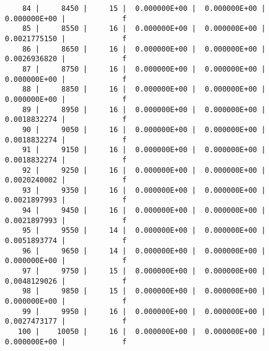 \documentclass[
  letterpaper,
  DIV=11,
  numbers=noendperiod]{scrartcl}
\begin{document}
\begin{verbatim}
    84 |     8450 |     15 |  0.000000E+00 |  0.000000E+00 |  0.000000E+00 |             f
    85 |     8550 |     16 |  0.000000E+00 |  0.000000E+00 |  0.0021775150 |             f
    86 |     8650 |     16 |  0.000000E+00 |  0.000000E+00 |  0.0026936820 |             f
    87 |     8750 |     16 |  0.000000E+00 |  0.000000E+00 |  0.000000E+00 |             f
    88 |     8850 |     16 |  0.000000E+00 |  0.000000E+00 |  0.000000E+00 |             f
    89 |     8950 |     16 |  0.000000E+00 |  0.000000E+00 |  0.0018832274 |             f
    90 |     9050 |     16 |  0.000000E+00 |  0.000000E+00 |  0.0018832274 |             f
    91 |     9150 |     16 |  0.000000E+00 |  0.000000E+00 |  0.0018832274 |             f
    92 |     9250 |     16 |  0.000000E+00 |  0.000000E+00 |  0.0020240002 |             f
    93 |     9350 |     16 |  0.000000E+00 |  0.000000E+00 |  0.0021897993 |             f
    94 |     9450 |     16 |  0.000000E+00 |  0.000000E+00 |  0.0021897993 |             f
    95 |     9550 |     14 |  0.000000E+00 |  0.000000E+00 |  0.0051893774 |             f
    96 |     9650 |     14 |  0.000000E+00 |  0.000000E+00 |  0.000000E+00 |             f
    97 |     9750 |     15 |  0.000000E+00 |  0.000000E+00 |  0.0048129026 |             f
    98 |     9850 |     15 |  0.000000E+00 |  0.000000E+00 |  0.000000E+00 |             f
    99 |     9950 |     16 |  0.000000E+00 |  0.000000E+00 |  0.0027473177 |             f
   100 |    10050 |     16 |  0.000000E+00 |  0.000000E+00 |  0.000000E+00 |             f
\end{verbatim}
\end{document}
